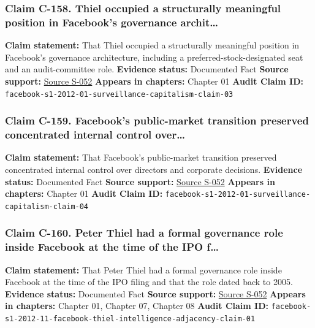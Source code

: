 \documentclass[
  american,
  11pt,
  letterpaper,
]{article}
\begin{document}
\subsubsection{Claim C-158. Thiel occupied a structurally meaningful
position in Facebook's governance
archit\ldots{}}\label{claim-c-158-thiel-occupied-a-structurally-meaningful-position-in-facebook-s-governance-archit}

\textbf{Claim statement:} That Thiel occupied a structurally meaningful
position in Facebook's governance architecture, including a
preferred-stock-designated seat and an audit-committee role.
\textbf{Evidence status:} Documented Fact \textbf{Source support:}
\hyperref[source-s-052-facebook-inc-registration-statement-on-form-s-1]{Source
S-052} \textbf{Appears in chapters:} Chapter 01 \textbf{Audit Claim ID:}
\texttt{facebook-s1-2012-01-surveillance-capitalism-claim-03}

\subsubsection{Claim C-159. Facebook's public-market transition
preserved concentrated internal control
over\ldots{}}\label{claim-c-159-facebook-s-public-market-transition-preserved-concentrated-internal-control-over}

\textbf{Claim statement:} That Facebook's public-market transition
preserved concentrated internal control over directors and corporate
decisions. \textbf{Evidence status:} Documented Fact \textbf{Source
support:}
\hyperref[source-s-052-facebook-inc-registration-statement-on-form-s-1]{Source
S-052} \textbf{Appears in chapters:} Chapter 01 \textbf{Audit Claim ID:}
\texttt{facebook-s1-2012-01-surveillance-capitalism-claim-04}

\subsubsection{Claim C-160. Peter Thiel had a formal governance role
inside Facebook at the time of the IPO
f\ldots{}}\label{claim-c-160-peter-thiel-had-a-formal-governance-role-inside-facebook-at-the-time-of-the-ipo-f}

\textbf{Claim statement:} That Peter Thiel had a formal governance role
inside Facebook at the time of the IPO filing and that the role dated
back to 2005. \textbf{Evidence status:} Documented Fact \textbf{Source
support:}
\hyperref[source-s-052-facebook-inc-registration-statement-on-form-s-1]{Source
S-052} \textbf{Appears in chapters:} Chapter 01, Chapter 07, Chapter 08
\textbf{Audit Claim ID:}
\texttt{facebook-s1-2012-11-facebook-thiel-intelligence-adjacency-claim-01}
\end{document}
